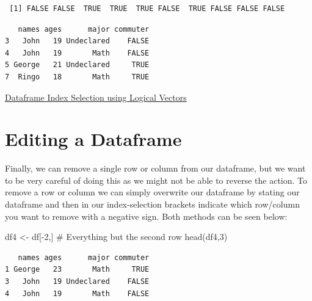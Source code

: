 \documentclass[
  letterpaper,
  DIV=11,
  numbers=noendperiod]{scrreprt}
\newenvironment{Shaded}{\begin{snugshade}}{\end{snugshade}}
\newcommand{\CommentTok}[1]{\textcolor[rgb]{0.37,0.37,0.37}{#1}}
\newcommand{\DecValTok}[1]{\textcolor[rgb]{0.68,0.00,0.00}{#1}}
\newcommand{\FunctionTok}[1]{\textcolor[rgb]{0.28,0.35,0.67}{#1}}
\newcommand{\NormalTok}[1]{\textcolor[rgb]{0.00,0.23,0.31}{#1}}
\newcommand{\OtherTok}[1]{\textcolor[rgb]{0.00,0.23,0.31}{#1}}
\newcommand{\SpecialCharTok}[1]{\textcolor[rgb]{0.37,0.37,0.37}{#1}}
\begin{document}
\begin{verbatim}
 [1] FALSE FALSE  TRUE  TRUE  TRUE FALSE  TRUE FALSE FALSE FALSE
\end{verbatim}

\begin{Shaded}
\end{Shaded}

\begin{verbatim}
   names ages      major commuter
3   John   19 Undeclared    FALSE
4   John   19       Math    FALSE
5 George   21 Undeclared     TRUE
7  Ringo   18       Math     TRUE
\end{verbatim}

\begin{watch}{}{}
    \href{https://youtu.be/hksRGX-YT6w}{Dataframe Index Selection using Logical Vectors}
\end{watch}

\section{Editing a Dataframe}\label{editing-a-dataframe}

Finally, we can remove a single row or column from our dataframe, but we
want to be very careful of doing this as we might not be able to reverse
the action. To remove a row or column we can simply overwrite our
dataframe by stating our dataframe and then in our index-selection
brackets indicate which row/column you want to remove with a negative
sign. Both methods can be seen below:

\begin{Shaded}
\begin{Highlighting}[]
\NormalTok{df4 }\OtherTok{\textless{}{-}}\NormalTok{ df[}\SpecialCharTok{{-}}\DecValTok{2}\NormalTok{,] }\CommentTok{\# Everything but the second row}
\FunctionTok{head}\NormalTok{(df4,}\DecValTok{3}\NormalTok{)}
\end{Highlighting}
\end{Shaded}

\begin{verbatim}
   names ages      major commuter
1 George   23       Math     TRUE
3   John   19 Undeclared    FALSE
4   John   19       Math    FALSE
\end{verbatim}
\end{document}
